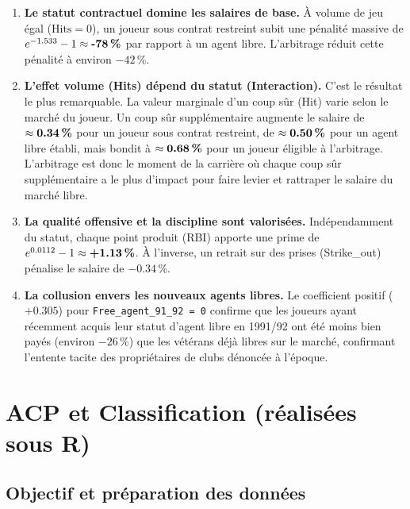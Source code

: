\documentclass[11pt,a4paper]{article}
\begin{document}
\begin{enumerate}
  \item \textbf{Le statut contractuel domine les salaires de base.} À volume de jeu égal ($\text{Hits} = 0$), un joueur sous contrat restreint subit une pénalité massive de $e^{-1.533} - 1 \approx \textbf{-78\,\%}$ par rapport à un agent libre. L'arbitrage réduit cette pénalité à environ $-42$\,\%.\vspace{0.3cm}
  \item \textbf{L'effet volume (Hits) dépend du statut (Interaction).} C'est le résultat le plus remarquable. La valeur marginale d'un coup sûr (Hit) varie selon le marché du joueur. Un coup sûr supplémentaire augmente le salaire de $\approx \textbf{0.34\,\%}$ pour un joueur sous contrat restreint, de $\approx \textbf{0.50\,\%}$ pour un agent libre établi, mais bondit à $\approx \textbf{0.68\,\%}$ pour un joueur éligible à l'arbitrage. L'arbitrage est donc le moment de la carrière où chaque coup sûr supplémentaire a le plus d'impact pour faire levier et rattraper le salaire du marché libre.\vspace{0.3cm}
  \item \textbf{La qualité offensive et la discipline sont valorisées.} Indépendamment du statut, chaque point produit (RBI) apporte une prime de $e^{0.0112} - 1 \approx \textbf{+1.13\,\%}$. À l'inverse, un retrait sur des prises (Strike\_out) pénalise le salaire de $-0.34$\,\%.\vspace{0.3cm}
  \item \textbf{La collusion envers les nouveaux agents libres.} Le coefficient positif ($+0.305$) pour \texttt{Free\_agent\_91\_92 = 0} confirme que les joueurs ayant récemment acquis leur statut d'agent libre en 1991/92 ont été moins bien payés (environ $-26$\,\%) que les vétérans déjà libres sur le marché, confirmant l'entente tacite des propriétaires de clubs dénoncée à l'époque.
\end{enumerate}

\newpage
\section{ACP et Classification (réalisées sous R)}

\subsection{Objectif et préparation des données}
\end{document}
